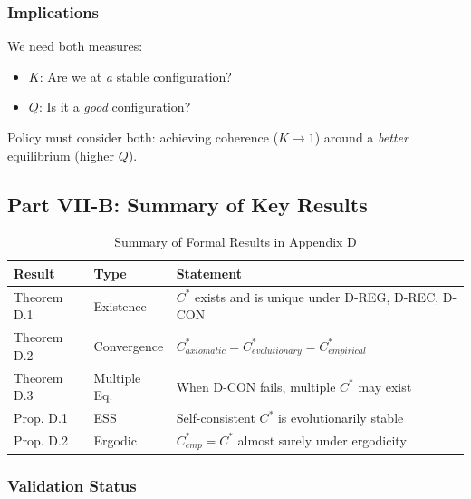\subsubsection{Implications}

We need both measures:
\begin{itemize}[nosep]
    \item $K$: Are we at \emph{a} stable configuration?
    \item $Q$: Is it a \emph{good} configuration?
\end{itemize}

Policy must consider both: achieving coherence ($K \to 1$) around a
\emph{better} equilibrium (higher $Q$).



\subsection{Part VII-B: Summary of Key Results}
\label{sec:D-results}

\begin{table}[htbp]
\centering
\caption{Summary of Formal Results in Appendix D}
\label{tab:D-results}
\renewcommand{\arraystretch}{1.2}
\begin{tabular}{@{}llp{6cm}@{}}
\toprule
\textbf{Result} & \textbf{Type} & \textbf{Statement} \\
\midrule
Theorem D.1 & Existence & $C^*$ exists and is unique under D-REG, D-REC, D-CON \\
Theorem D.2 & Convergence & $C^*_{axiomatic} = C^*_{evolutionary} = C^*_{empirical}$ \\
Theorem D.3 & Multiple Eq. & When D-CON fails, multiple $C^*$ may exist \\
Prop. D.1 & ESS & Self-consistent $C^*$ is evolutionarily stable \\
Prop. D.2 & Ergodic & $C^*_{emp} = C^*$ almost surely under ergodicity \\
\bottomrule
\end{tabular}
\end{table}

\subsubsection{Validation Status}


